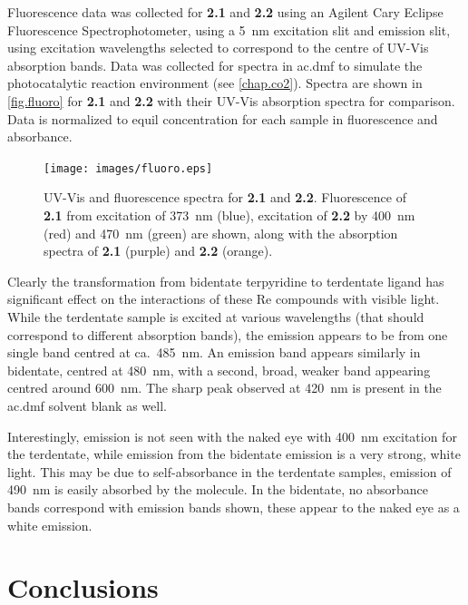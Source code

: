 Fluorescence data was collected for \textbf{2.1} and \textbf{2.2} using an Agilent Cary Eclipse Fluorescence Spectrophotometer, using a 5~nm excitation slit and emission slit, using excitation wavelengths selected to correspond to the centre of UV-Vis absorption bands. Data was collected for spectra in \gls{ac.dmf} to simulate the photocatalytic reaction environment (see \autoref{chap.co2}). Spectra are shown in \autoref{fig.fluoro} for \textbf{2.1} and \textbf{2.2} with their UV-Vis absorption spectra for comparison. Data is normalized to equil concentration for each sample in fluorescence and absorbance.

\begin{figure}[!htb]
 \centering
  \texttt{[image: images/fluoro.eps]}
 \caption[UV-Vis and fluorescence spectra for \textbf{2.1} and \textbf{2.2}]{UV-Vis and fluorescence spectra for \textbf{2.1} and \textbf{2.2}. Fluorescence of \textbf{2.1} from excitation of 373~nm (blue), excitation of \textbf{2.2} by 400~nm (red) and 470~nm (green) are shown, along with the absorption spectra of \textbf{2.1} (purple) and \textbf{2.2} (orange).}
 \label{fig.fluoro}
\end{figure}

Clearly the transformation from bidentate terpyridine to terdentate ligand has significant effect on the interactions of these Re compounds with visible light. While the terdentate sample is excited at various wavelengths (that should correspond to different absorption bands), the emission appears to be from one single band centred at ca.~485~nm. An emission band appears similarly in bidentate, centred at 480~nm, with a second, broad, weaker band appearing centred around 600~nm. The sharp peak observed at 420~nm is present in the \gls{ac.dmf} solvent blank as well.

Interestingly, emission is not seen with the naked eye with 400~nm excitation for the terdentate, while emission from the bidentate emission is a very strong, white light. This may be due to self-absorbance in the terdentate samples, emission of 490~nm is easily absorbed by the molecule. In the bidentate, no absorbance bands correspond with emission bands shown, these appear to the naked eye as a white emission.

\FloatBarrier
\section{Conclusions}

